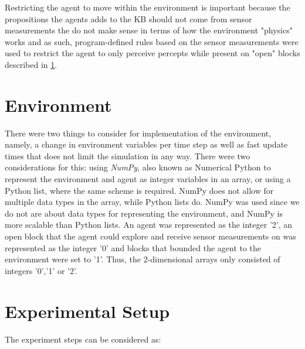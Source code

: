 Restricting the agent to move within the environment is important because the propositions the agents adds to the KB should not come from sensor measurements the do not make sense in terms of how the environment "physics" works and as such, program-defined rules based on the sensor measurements were used to restrict the agent to only perceive percepts while present on "open" blocks described in \ref{sec:environment}.




\section{Environment}
\label{sec:environment}

There were two things to consider for implementation of the environment, namely, a change in environment variables per time step as well as fast update times that does not limit the simulation in any way. There were two considerations for this: using \textit{NumPy}, also known as Numerical Python to represent the environment and agent as integer variables in an array, or using a Python list, where the same scheme is required. NumPy does not allow for multiple data types in the array, while Python lists do. NumPy was used since we do not are about data types for representing the environment, and NumPy is more scalable than Python lists. An agent was represented as the integer '2', an open block that the agent could explore and receive sensor measurements on was represented as the integer '0' and blocks that bounded the agent to the environment were set to '1'. Thus, the 2-dimensional arrays only consisted of integers '0','1' or '2'. 
\section{Experimental Setup}
\label{sec:experimental_method}

The experiment steps can be considered as:

